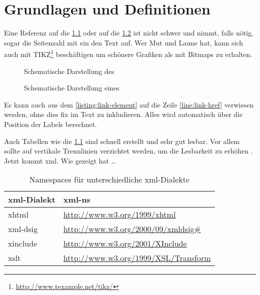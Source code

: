 
\chapter{Grundlagen und Definitionen}
\label{chap:GrundlagenDefinitionen}
\blindtext

Eine Referenz auf die \cref{fig:wot} oder auf die \cref{fig:ht} ist nicht schwer und nimmt, falls nötig, sogar die Seitenzahl mit ein den Text auf. Wer Mut und
Laune hat, kann sich auch mit TIKZ\footnote{\url{http://www.texample.net/tikz/}} beschäftigen um schönere Grafiken als mit Bitmaps zu erhalten.

\begin{figure}
\centering

\caption{Schematische Darstellung des }
\label{fig:wot}
\end{figure}


\begin{figure}
\centering
\begin{sideways}

\end{sideways}
\caption{Schematische Darstellung eines }
\label{fig:ht}
\end{figure}

Es kann auch aus dem \cref{listing:link-element} auf die Zeile \ref{line:link-href} verwiesen werden, ohne dies fix im Text zu inkludieren. Alles wird automatisch über die
Position der Labels berechnet.



Auch Tabellen wie die \cref{tab:xml-namespaces} sind schnell erstellt und sehr gut lesbar. Vor allem sollte auf vertikale Trennlinien verzichtet werden, um die
Lesbarkeit zu erhöhen \cite{latex}. Jetzt kommt \gls{xml}. Wie  gezeigt hat \ldots

\begin{table}
    \centering
    \begin{tabularx}{\textwidth}{ l X }
        \gls{xml}-Dialekt  & \gls{xml-ns} \\
        \hline
        \hline
        \gls{xhtml} & \url{http://www.w3.org/1999/xhtml} \\
        \hline
        \gls{xml-dsig} & \url{http://www.w3.org/2000/09/xmldsig\#} \\
        \hline
        \gls{xinclude} & \url{http://www.w3.org/2001/XInclude} \\
        \hline
        \gls{xslt} & \url{http://www.w3.org/1999/XSL/Transform} \\
        \hline
    \end{tabularx}
    \caption{Namespaces für unterschiedliche \protect\gls{xml}-Dialekte}
    \label{tab:xml-namespaces}
\end{table}

